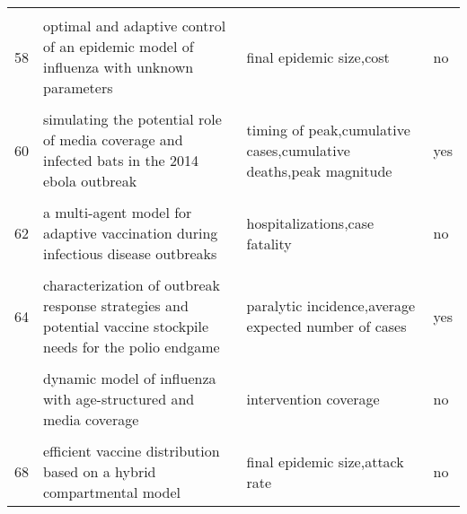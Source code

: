 \documentclass[
]{article}
\begin{document}
\begin{landscape}
\begin{longtable}{l>{\raggedright\arraybackslash}p{4cm}>{\raggedright\arraybackslash}p{6cm}l}
\cellcolor{gray!6}{57} & \cellcolor{gray!6}{modelling the transmission and control strategies of varicella among school children in shenzhen, china} & \cellcolor{gray!6}{cases averted,intervention coverage,final epidemic size,peak size} & \cellcolor{gray!6}{no}\\
58 & optimal and adaptive control of an epidemic model of influenza with unknown parameters & final epidemic size,cost & no\\
\cellcolor{gray!6}{59} & \cellcolor{gray!6}{simulating endogenous dynamics of intervention-capacity deployment: ebola outbreak in liberia} & \cellcolor{gray!6}{effective reproduction number} & \cellcolor{gray!6}{no}\\
60 & simulating the potential role of media coverage and infected bats in the 2014 ebola outbreak & timing of peak,cumulative cases,cumulative deaths,peak magnitude & yes\\
\addlinespace
\cellcolor{gray!6}{61} & \cellcolor{gray!6}{a mathematical model of ebola virus disease: using sensitivity analysis to determine effective intervention targets} & \cellcolor{gray!6}{r0} & \cellcolor{gray!6}{yes}\\
62 & a multi-agent model for adaptive vaccination during infectious disease outbreaks & hospitalizations,case fatality & no\\
\cellcolor{gray!6}{63} & \cellcolor{gray!6}{assessing the efficiency of movement restriction as a control strategy of ebola} & \cellcolor{gray!6}{final epidemic size} & \cellcolor{gray!6}{no}\\
64 & characterization of outbreak response strategies and potential vaccine stockpile needs for the polio endgame & paralytic incidence,average expected number of cases & yes\\
\cellcolor{gray!6}{65} & \cellcolor{gray!6}{designing public health policies to mitigate the adverse consequences of rural-urban migration via meta-population modeling} & \cellcolor{gray!6}{final epidemic size,vaccine doses,peak magnitude} & \cellcolor{gray!6}{no}\\
\addlinespace
66 & dynamic model of influenza with age-structured and media coverage & intervention coverage & no\\
\cellcolor{gray!6}{67} & \cellcolor{gray!6}{economic evaluation of individual school closure strategies: the hong kong 2009 h1n1 pandemic} & \cellcolor{gray!6}{cost,attack rate} & \cellcolor{gray!6}{yes}\\
68 & efficient vaccine distribution based on a hybrid compartmental model & final epidemic size,attack rate & no\\

\end{longtable}
\end{landscape}
\end{document}
